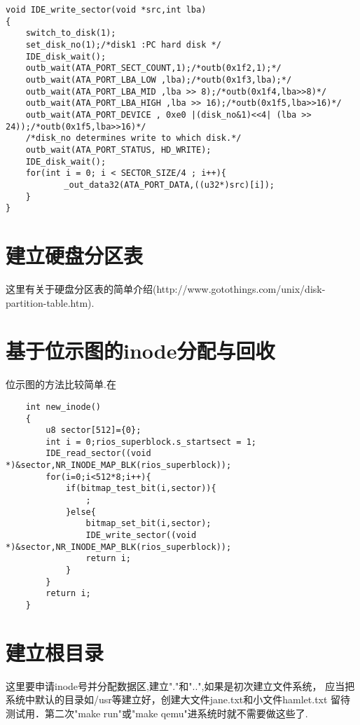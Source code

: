 \begin{verbatim}
void IDE_write_sector(void *src,int lba)
{
	switch_to_disk(1);
	set_disk_no(1);/*disk1 :PC hard disk */
	IDE_disk_wait();
	outb_wait(ATA_PORT_SECT_COUNT,1);/*outb(0x1f2,1);*/
	outb_wait(ATA_PORT_LBA_LOW ,lba);/*outb(0x1f3,lba);*/
	outb_wait(ATA_PORT_LBA_MID ,lba >> 8);/*outb(0x1f4,lba>>8)*/
	outb_wait(ATA_PORT_LBA_HIGH ,lba >> 16);/*outb(0x1f5,lba>>16)*/
	outb_wait(ATA_PORT_DEVICE , 0xe0 |(disk_no&1)<<4| (lba >> 24));/*outb(0x1f5,lba>>16)*/
	/*disk_no determines write to which disk.*/
	outb_wait(ATA_PORT_STATUS, HD_WRITE);
	IDE_disk_wait();
	for(int i = 0; i < SECTOR_SIZE/4 ; i++){
	　　　　 _out_data32(ATA_PORT_DATA,((u32*)src)[i]);
	}
}
\end{verbatim}
\section{建立硬盘分区表}
这里有关于硬盘分区表的简单介绍(http://www.gotothings.com/unix/disk-partition-table.htm).


\section{基于位示图的inode分配与回收}
位示图的方法比较简单.在
\begin{verbatim}
	int new_inode()
	{
		u8 sector[512]={0};
		int i = 0;rios_superblock.s_startsect = 1;
		IDE_read_sector((void *)&sector,NR_INODE_MAP_BLK(rios_superblock));
		for(i=0;i<512*8;i++){
			if(bitmap_test_bit(i,sector)){
				;
			}else{
				bitmap_set_bit(i,sector);
				IDE_write_sector((void *)&sector,NR_INODE_MAP_BLK(rios_superblock));
				return i;
			}
		}
		return i;
	}
\end{verbatim}	
\section{建立根目录}
这里要申请inode号并分配数据区,建立"."和"..",如果是初次建立文件系统，
应当把系统中默认的目录如/usr等建立好，创建大文件jane.txt和小文件hamlet.txt
留待测试用．第二次"make run"或"make qemu"进系统时就不需要做这些了.

